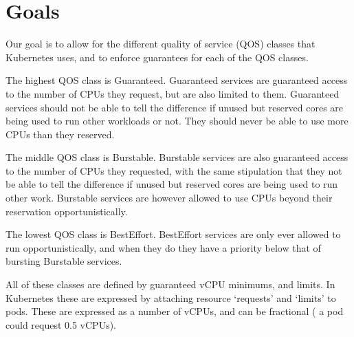 \section{Goals}
\label{s:goals}


Our goal is to allow for the different quality of service (QOS) classes that
Kubernetes uses, and to enforce guarantees for each of the QOS classes.


The highest QOS class is Guaranteed. Guaranteed services are guaranteed access
to the number of CPUs they request, but are also limited to them. Guaranteed
services should not be able to tell the difference if unused but reserved cores
are being used to run other workloads or not. They should never be able to use
more CPUs than they reserved.

The middle QOS class is Burstable. Burstable services are also guaranteed access
to the number of CPUs they requested, with the same stipulation that they not be
able to tell the difference if unused but reserved cores are being used to run
other work. Burstable services are however allowed to use CPUs beyond their
reservation opportunistically.

The lowest QOS class is BestEffort. BestEffort services are only ever allowed to
run opportunistically, and when they do they have a priority below that of
bursting Burstable services.

All of these classes are defined by guaranteed vCPU minimums, and limits. In
Kubernetes these are expressed by attaching resource `requests' and `limits' to
pods. These are expressed as a number of vCPUs, and can be fractional (\ie{} a
pod could request 0.5 vCPUs).

